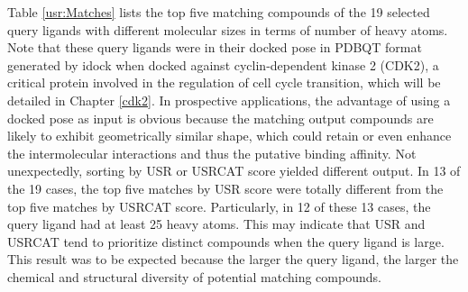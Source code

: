 Table \ref{usr:Matches} lists the top five matching compounds of the 19 selected query ligands with different molecular sizes in terms of number of heavy atoms. Note that these query ligands were in their docked pose in PDBQT format generated by idock \citep{1362} when docked against cyclin-dependent kinase 2 (CDK2), a critical protein involved in the regulation of cell cycle transition, which will be detailed in Chapter \ref{cdk2}. In prospective applications, the advantage of using a docked pose as input is obvious because the matching output compounds are likely to exhibit geometrically similar shape, which could retain or even enhance the intermolecular interactions and thus the putative binding affinity. Not unexpectedly, sorting by USR or USRCAT score yielded different output. In 13 of the 19 cases, the top five matches by USR score were totally different from the top five matches by USRCAT score. Particularly, in 12 of these 13 cases, the query ligand had at least 25 heavy atoms. This may indicate that USR and USRCAT tend to prioritize distinct compounds when the query ligand is large. This result was to be expected because the larger the query ligand, the larger the chemical and structural diversity of potential matching compounds.

